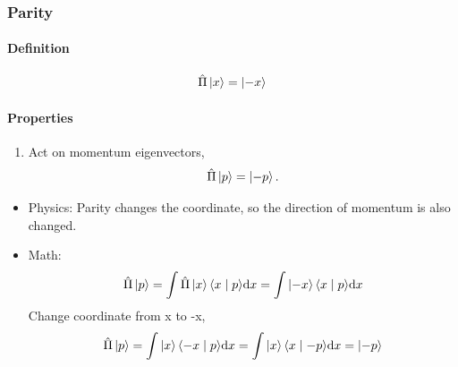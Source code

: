\documentclass[letterpaper,10pt,english]{sphinxmanual}
\def\d{{\rm d}}
\newcommand{\ket}[1]{\left| #1\right\rangle}
\newcommand{\braket}[2]{\langle #1 \mid #2 \rangle}
\begin{document}
\subsubsection{Parity}
\label{Quantum/QuantumMechanics:id2}

\paragraph{Definition}
\label{Quantum/QuantumMechanics:definition}\begin{gather}
\begin{split}\hat \Pi \ket{x}= \ket{-x}\end{split}\notag
\end{gather}

\paragraph{Properties}
\label{Quantum/QuantumMechanics:properties}\begin{enumerate}
\item {} 
Act on momentum eigenvectors,
\begin{gather}
\begin{split}\hat \Pi \ket{p} = \ket{-p} .\end{split}\notag
\end{gather}
\end{enumerate}
\begin{itemize}
\item {} 
Physics: Parity changes the coordinate, so the direction of momentum is also changed.

\item {} 
Math:
\begin{gather}
\begin{split}\hat \Pi \ket{p} = \int \hat \Pi \ket{x}\braket{x}{p}\d x= \int \ket{-x}\braket{x}{p}\d x\end{split}\notag
\end{gather}
Change coordinate from x to -x,
\begin{gather}
\begin{split}\hat \Pi \ket{p} = \int \ket{x}\braket{-x}{p}\d x = \int \ket{x}\braket{x}{-p}\d x  = \ket{-p}\end{split}\notag
\end{gather}
\end{itemize}
\end{document}
